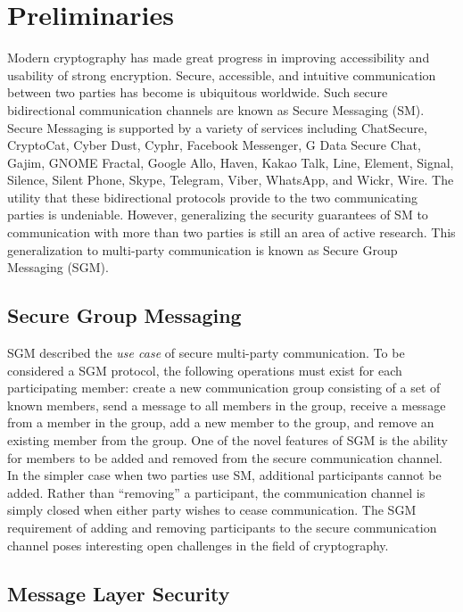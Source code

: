 \hypertarget{preliminaries}{%
\chapter{Preliminaries}\label{preliminaries}}

Modern cryptography has made great progress in improving accessibility and usability of strong encryption.
Secure, accessible, and intuitive communication between two parties has become is ubiquitous worldwide.
Such secure bidirectional communication channels are known as Secure Messaging (SM).
Secure Messaging is supported by a variety of services including ChatSecure, CryptoCat, Cyber Dust, Cyphr, Facebook Messenger, G Data Secure Chat, Gajim, GNOME Fractal, Google Allo, Haven, Kakao Talk, Line, Element, Signal, Silence, Silent Phone, Skype, Telegram, Viber, WhatsApp, and Wickr, Wire.
The utility that these bidirectional protocols provide to the two communicating parties is undeniable.
However, generalizing the security guarantees of SM to communication with more than two parties is still an area of active research.
This generalization to multi-party communication is known as Secure Group Messaging (SGM).

\hypertarget{secure-group-messaging}{%
\section{Secure Group Messaging}\label{secure-group-messaging}}

SGM described the \emph{use case} of secure multi-party communication.
To be considered a SGM protocol, the following operations must exist for each participating member: create a new communication group consisting of a set of known members, send a message to all members in the group, receive a message from a member in the group, add a new member to the group, and remove an existing member from the group.
One of the novel features of SGM is the ability for members to be added and removed from the secure communication channel.
In the simpler case when two parties use SM, additional participants cannot be added.
Rather than ``removing'' a participant, the communication channel is simply closed when either party wishes to cease communication.
The SGM requirement of adding and removing participants to the secure communication channel poses interesting open challenges in the field of cryptography.

\hypertarget{message-layer-security}{%
\section{Message Layer Security}\label{message-layer-security}}


